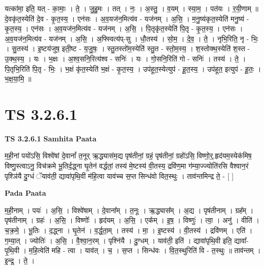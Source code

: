 \documentclass[17pt]{extarticle}
\begin{document}
यत्का॑मा॒ इति॒ यत् - का॒माः॒ । ते॒ । जु॒हु॒मः । तत् । नः॒ । अ॒स्तु॒ । व॒यम् । स्या॒म॒ । पत॑यः । र॒यी॒णाम् ॥ दे॒वकृ॑त॒स्येति॑ दे॒व - कृ॒त॒स्य॒ । एन॑सः । अ॒व॒यज॑न॒मित्य॑व - यज॑नम् । अ॒सि॒ । म॒नु॒ष्य॑कृत॒स्येति॑ मनु॒ष्य॑ - कृ॒त॒स्य॒ । एन॑सः । अ॒व॒यज॑न॒मित्य॑व - यज॑नम् । अ॒सि॒ । पि॒तृकृ॑त॒स्येति॑ पि॒तृ - कृ॒त॒स्य॒ । एन॑सः । अ॒व॒यज॑न॒मित्य॑व - यज॑नम् । अ॒सि॒ । अ॒फ्स्वित्य॑प्-सु । धौ॒तस्य॑ । सो॒म॒ । दे॒व॒ । ते॒ । नृभि॒रिति॒ नृ - भिः॒ । सु॒तस्य॑ । इ॒ष्टय॑जुष॒ इती॒ष्ट - य॒जु॒षः॒ । स्तु॒तस्तो॑म॒स्येति॑ स्तु॒त - स्तो॒म॒स्य॒ । श॒स्तोक्थ॒स्येति॑ श॒स्त - उ॒क्थ॒स्य॒ । यः । भ॒क्षः । अ॒श्व॒सनि॒रित्य॑श्व - सनिः॑ । यः । गो॒सनि॒रिति॑ गो - सनिः॑ । तस्य॑ । ते॒ । पि॒तृभि॒रिति॑ पि॒तृ - भिः॒ । भ॒क्षं कृ॑त॒स्येति॑ भ॒क्षं - कृ॒त॒स्य॒ । उप॑हूत॒स्येत्युप॑ - हू॒त॒स्य॒ । उप॑हूत॒ इत्युप॑ - हू॒तः॒ । भ॒क्ष॒या॒मि॒ ॥  \newline




\section*{ TS 3.2.6.1 }

\textbf{TS 3.2.6.1 } \newline
\textbf{Samhita Paata} \newline

म॒ही॒नां पयो॑ऽसि॒ विश्वे॑षां दे॒वानां᳚ त॒नूर् ऋ॒द्ध्यास॑म॒द्य पृष॑तीनां॒ ग्रहं॒ पृष॑तीनां॒ ग्रहो॑ऽसि॒ विष्णो॒र्॒.हृद॑यम॒स्येक॑मिष॒ विष्णु॒स्त्वाऽनु॒ विच॑क्रमे भू॒तिर्द॒द्ध्ना घृ॒तेन॑ वर्द्धतां॒ तस्य॑ मे॒ष्टस्य॑ वी॒तस्य॒ द्रवि॑ण॒मा ग॑म्या॒ज्ज्योति॑रसि वैश्वान॒रं पृश्ञि॑यै दु॒ग्धं ॅयाव॑ती॒ द्यावा॑पृथि॒वी म॑हि॒त्वा याव॑च्च स॒प्त सिन्ध॑वो वित॒स्थुः । ताव॑न्तमिन्द्र ते॒ - [  ] \newline

\textbf{Pada Paata} \newline

म॒ही॒नाम् । पयः॑ । अ॒सि॒ । विश्वे॑षाम् । दे॒वाना᳚म् । त॒नूः । ऋ॒द्ध्यास᳚म् । अ॒द्य । पृष॑तीनाम् । ग्रह᳚म् । पृष॑तीनाम् । ग्रहः॑ । अ॒सि॒ । विष्णोः᳚ । हृद॑यम् । अ॒सि॒ । एक᳚म् । इ॒ष॒ । विष्णुः॑ । त्वा॒ । अनु॑ । वीति॑ । च॒क्र॒मे॒ । भू॒तिः । द॒द्ध्ना । घृ॒तेन॑ । व॒र्द्ध॒ता॒म् । तस्य॑ । मा॒ । इ॒ष्टस्य॑ । वी॒तस्य॑ । द्रवि॑णम् । एति॑ । ग॒म्या॒त् । ज्योतिः॑ । अ॒सि॒ । वै॒श्वा॒न॒रम् । पृश्नि॑यै । दु॒ग्धम् । याव॑ती॒ इति॑ । द्यावा॑पृथि॒वी इति॒ द्यावा᳚-पृ॒थि॒वी । म॒हि॒त्वेति॑ महि - त्वा । याव॑त् । च॒ । स॒प्त । सिन्ध॑वः । वि॒त॒स्थुरिति॑ वि - त॒स्थुः ॥ ताव॑न्तम् । इ॒न्द्र॒ । ते॒ ।  \newline
\end{document}
